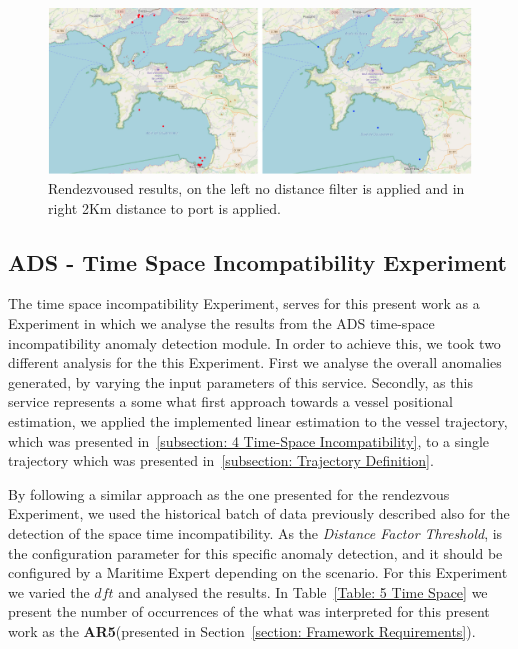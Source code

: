 \begin{figure}[H]
	\centering
	\includegraphics[width=\textwidth]{figures/Ch5/ThesisExpRend.pdf}
    \caption{Rendezvoused results, on the left no distance filter is applied and in right 2Km distance to port is applied.}
    \label{fig: Chapter 5 Rend2Mapsr}
\end{figure}



\subsection{ADS - Time Space Incompatibility Experiment}
\label{subsection: ADS - Time Space Incompatibility Experiment}
The time space incompatibility Experiment, serves for this present work as a Experiment in which we analyse the results from the ADS time-space incompatibility anomaly detection module. In order to achieve this, we took two different analysis for the this Experiment. First we analyse the overall anomalies generated, by varying the input parameters of this service. Secondly, as this service represents a some what first approach towards a vessel positional estimation, we applied the implemented linear estimation to the vessel trajectory, which was presented in~\ref{subsection: 4 Time-Space Incompatibility}, to a single trajectory which was presented in~\ref{subsection: Trajectory Definition}.

By following a similar approach as the one presented for the rendezvous Experiment, we used the historical batch of data previously described also for the detection of the space time incompatibility. As the \emph{Distance Factor Threshold}, is the configuration parameter for this specific anomaly detection, and it should be configured by a Maritime Expert depending on the scenario. For this Experiment we varied the $dft$ and analysed the results.  In Table~\ref{Table: 5 Time Space} we present the number of occurrences of the what was interpreted for this present work as the \textbf{AR5}(presented in Section~\ref{section: Framework Requirements}). 

